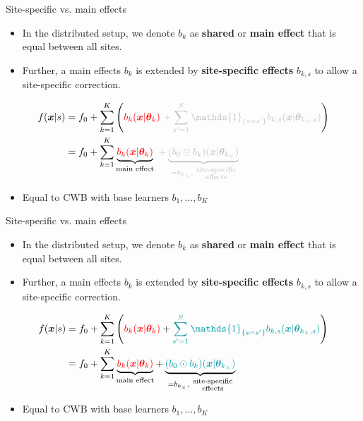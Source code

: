 \documentclass[t,10pt]{beamer}
\begin{document}
\begin{frame}{Site-specific vs. main effects}
  \begin{itemize}
    \item
      In the distributed setup, we denote $b_k$ as {\color{red}\textbf{shared} or \textbf{main effect}} that is equal between all sites.
    \item
      Further, a main effects $b_k$ is extended by \textbf{site-specific effects} $b_{k,s}$ to allow a site-specific correction.
  \end{itemize}
    \vspace{-0.2cm}
  \begin{align*}
  f(\xv|s) &= f_0 + \sum_{k=1}^K\left({\color{red}b_k(\xv|\tb_k)} \ {\color{lightgray}+ \sum_{s^\prime=1}^S  \mathds{1}_{\{s = s^\prime\}}b_{k,s}(\xv|\tb_{\lsite,s})}\right) \\
  &= f_0 + \sum_{k=1}^K \underbrace{{\color{red}b_k(\xv|\tb_k)}}_{\text{main effect}} \ {\color{lightgray}+ \underbrace{(b_0 \odot b_k)(\xv|\tb_{\lsite})}_{=b_{\lsite},\ \substack{\text{site-specific} \\ \text{effects}}}}
  \end{align*}\vspace{-0.4cm}
  \begin{itemize}
        \item 
            Equal to {\color{red}CWB with base learners $b_1, \dots, b_K$} 
  \end{itemize}
  \addtocounter{framenumber}{-1}
\end{frame}

\begin{frame}{Site-specific vs. main effects}
  \begin{itemize}
    \item
      In the distributed setup, we denote $b_k$ as {\color{red}\textbf{shared} or \textbf{main effect}} that is equal between all sites.
    \item
      Further, a main effects $b_k$ is extended by {\color{blue}\textbf{site-specific effects} $b_{k,s}$} to allow a site-specific correction.
  \end{itemize}
    \vspace{-0.2cm}
  \begin{align*}
  f(\xv|s) &= f_0 + \sum_{k=1}^K\left({\color{red}b_k(\xv|\tb_k)} + {\color{blue} \sum_{s^\prime=1}^S  \mathds{1}_{\{s = s^\prime\}}b_{k,s}(\xv|\tb_{\lsite,s})}\right) \\
  &= f_0 + \sum_{k=1}^K \underbrace{{\color{red}b_k(\xv|\tb_k)}}_{\text{main effect}} + \underbrace{{\color{blue}(b_0 \odot b_k)(\xv|\tb_{\lsite})}}_{=b_{\lsite},\ \substack{\text{site-specific} \\ \text{effects}}}
  \end{align*}\vspace{-0.4cm}
  \begin{itemize}
        \item 
            Equal to {\color{red}CWB with base learners $b_1, \dots, b_K$} 
  \end{itemize}
  \addtocounter{framenumber}{-1}
\end{frame}
\end{document}
